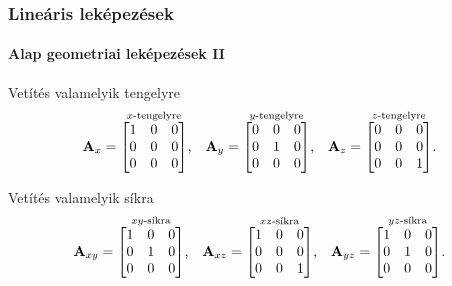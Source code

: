 \documentclass[xcolor={table}]{beamer}
\begin{document}
\begin{frame}
  \frametitle{Lineáris leképezések}
  \framesubtitle{Alap geometriai leképezések II}

  \begin{block}{Vetítés valamelyik tengelyre}
    \[
      \mathbf{A}_x = \overset{x\text{-tengelyre}}{\begin{bmatrix}
          1 & 0 & 0 \\
          0 & 0 & 0 \\
          0 & 0 & 0
        \end{bmatrix}}
      \text,
      \quad
      \mathbf{A}_y = \overset{y\text{-tengelyre}}{\begin{bmatrix}
          0 & 0 & 0 \\
          0 & 1 & 0 \\
          0 & 0 & 0
        \end{bmatrix}}
      \text,
      \quad
      \mathbf{A}_z = \overset{z\text{-tengelyre}}{\begin{bmatrix}
          0 & 0 & 0 \\
          0 & 0 & 0 \\
          0 & 0 & 1
        \end{bmatrix}}
      \text.
    \]
  \end{block}

  \begin{block}{Vetítés valamelyik síkra}
    \[
      \mathbf{A}_{xy} = \overset{xy\text{-síkra}}{\begin{bmatrix}
          1 & 0 & 0 \\
          0 & 1 & 0 \\
          0 & 0 & 0
        \end{bmatrix}}
      \text,
      \quad
      \mathbf{A}_{xz} = \overset{xz\text{-síkra}}{\begin{bmatrix}
          1 & 0 & 0 \\
          0 & 0 & 0 \\
          0 & 0 & 1
        \end{bmatrix}}
      \text,
      \quad
      \mathbf{A}_{yz} = \overset{yz\text{-síkra}}{\begin{bmatrix}
          1 & 0 & 0 \\
          0 & 1 & 0 \\
          0 & 0 & 0
        \end{bmatrix}}
      \text.
    \]
  \end{block}
\end{frame}
\end{document}
